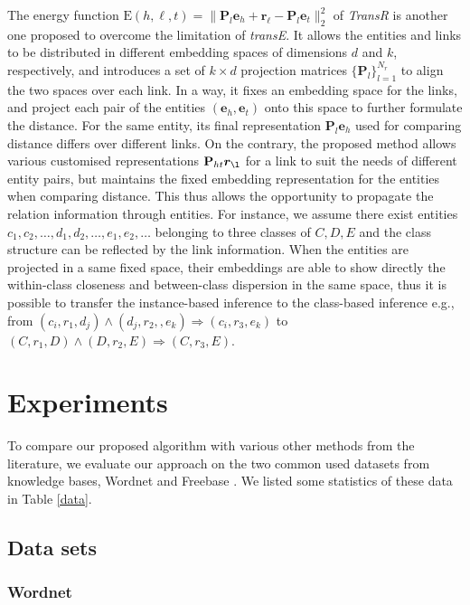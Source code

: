 \documentclass[9pt]{sig-alternate-05-2015}
\begin{document}
The energy function  $\mathrm{E}{(h,\ell, t)} = \|\textbf{P}_l\bm{e}_h + \bm{r}_{\ell}-\textbf{P}_l\bm{e}_t\|_2^2$ of \emph{TransR} \cite{lin_learning_2015} is another one proposed to overcome the limitation of   \emph{transE}. It allows the entities and links to be distributed in different embedding spaces of dimensions $d$ and $k$, respectively, and  introduces a set of $ k\times d$ projection matrices $\{\textbf{P}_l\}_{l=1}^{N_r}$ to align the two spaces over each link. In a way, it fixes an embedding space for the links, and project each pair of the entities $(\bm{e}_h, \bm{e}_t)$ onto this space to further formulate the distance. For the same entity,  its final representation $\textbf{P}_l\bm{e}_h$ used for comparing distance  differs over different links. On the contrary, the proposed method allows various customised representations $\textbf{P}_{ht} \bm{r}_{\l}$ for a link to suit the needs of different entity pairs, but maintains the fixed embedding representation for the entities when comparing distance. This thus allows the opportunity to propagate the relation information through entities. For instance, we assume there exist entities $c_1,c_2, \ldots,d_1,d_2,\ldots, e_1, e_2, \ldots$ belonging to three classes of $C,D,E$ and the class structure can be reflected by the link information.   When the entities are projected in a same fixed space,  their embeddings are able to  show directly the within-class closeness and between-class dispersion in the same space, thus it is possible to  transfer the instance-based inference to the class-based inference e.g., from $(c_i, r_1, d_j) \wedge (d_j, r_2,, e_k) \Rightarrow  (c_i, r_3, e_k)$ to $(C, r_1, D)\wedge (D, r_2, E) \Rightarrow  (C, r_3, E)$.



\section{Experiments} \label{exp}
To compare our proposed algorithm with various other methods from the literature, we evaluate our approach on the two common used datasets from knowledge bases, Wordnet \cite{miller_wordnet:_1995} and Freebase \cite{bollacker_freebase:_2008}. We listed some statistics of these data in Table \ref{data}.

\subsection{Data sets}
\subsubsection{Wordnet} 
\end{document}
